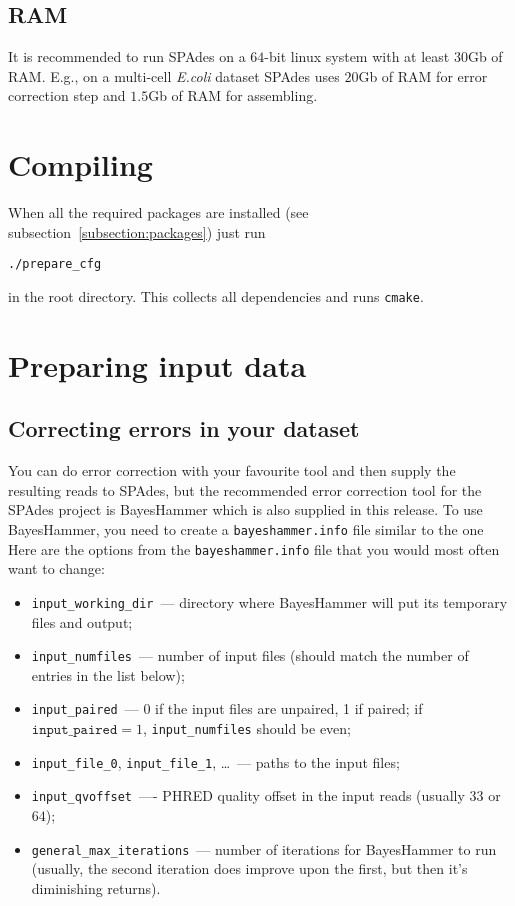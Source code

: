 \documentclass{article}
\def\spades{SPAdes}
\def\bh{BayesHammer}
\begin{document}
\subsection{RAM}
It is recommended to run {\spades} on a $64$-bit linux system with at least $30$Gb of RAM.
E.g., on a multi-cell {\it E.coli} dataset {\spades} uses $20$Gb of RAM for error correction step
and $1.5$Gb of RAM for assembling.{}

\section{Compiling}
When all the required packages are installed (see 
subsection~\ref{subsection:packages})
just run
\begin{lstlisting}
./prepare_cfg
\end{lstlisting}
in the root directory. 
This collects all dependencies and runs {\tt cmake}.

\section{Preparing input data}
\subsection{Correcting errors in your dataset}
You can do error correction with your favourite tool and then supply the resulting reads to {\spades}, but the recommended error correction tool for
the {\spades} project is {\bh} which is also supplied in this release. To use {\bh}, you need to create a {\tt bayeshammer.info} file similar to the one
Here are the options from the {\tt bayeshammer.info} file that you would most often want to change:
\begin{itemize}
\item \verb$input_working_dir$~--- directory where BayesHammer will put its temporary files and output;
\item \verb$input_numfiles$~--- number of input files (should match the number of entries in the list below);
\item \verb$input_paired$~--- $0$ if the input files are unpaired, 1 if paired; if $\texttt{input\_paired}=1$, \verb$input_numfiles$ should be even;
\item \verb$input_file_0$, \verb$input_file_1$, \ldots ~--- paths to the input files;
\item \verb$input_qvoffset$~---- PHRED quality offset in the input reads (usually $33$ or $64$);
\item \verb$general_max_iterations$~--- number of iterations for {\bh} to run (usually, the second iteration does improve upon the first, but then it's
diminishing returns).
\end{itemize}
\end{document}
